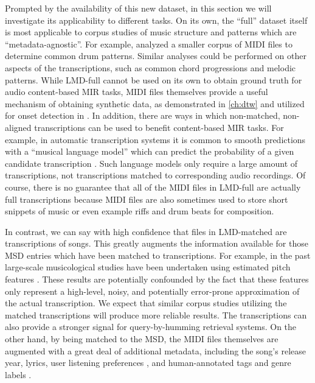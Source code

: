 Prompted by the availability of this new dataset, in this section we will investigate its applicability to different tasks.
On its own, the ``full'' dataset itself is most applicable to corpus studies of music structure and patterns which are ``metadata-agnostic''.
For example, \cite{mauch2012corpus} analyzed a smaller corpus of MIDI files to determine common drum patterns.
Similar analyses could be performed on other aspects of the transcriptions, such as common chord progressions and melodic patterns.
While LMD-full cannot be used on its own to obtain ground truth for audio content-based MIR tasks, MIDI files themselves provide a useful mechanism of obtaining synthetic data, as demonstrated in \cref{ch:dtw} and utilized for onset detection in \cite{bello2005tutorial}.
In addition, there are ways in which non-matched, non-aligned transcriptions can be used to benefit content-based MIR tasks.
For example, in automatic transcription systems it is common to smooth predictions with a ``musical language model'' which can predict the probability of a given candidate transcription \cite{poliner2007discriminative,sigtia2015end}.
Such language models only require a large amount of transcriptions, not transcriptions matched to corresponding audio recordings.
Of course, there is no guarantee that all of the MIDI files in LMD-full are actually full transcriptions because MIDI files are also sometimes used to store short snippets of music or even example riffs and drum beats for composition.

In contrast, we can say with high confidence that files in LMD-matched are transcriptions of songs.
This greatly augments the information available for those MSD entries which have been matched to transcriptions.
For example, in the past large-scale musicological studies have been undertaken using estimated pitch features \cite{serra2012measuring,bertin2010clustering}.
These results are potentially confounded by the fact that these features only represent a high-level, noisy, and potentially error-prone approximation of the actual transcription.
We expect that similar corpus studies utilizing the matched transcriptions will produce more reliable results.
The transcriptions can also provide a stronger signal for query-by-humming retrieval systems.
On the other hand, by being matched to the MSD, the MIDI files themselves are augmented with a great deal of additional metadata, including the song's release year, lyrics, user listening preferences \cite{jansson2015this}, and human-annotated tags and genre labels \cite{schreiber2015improving}.

